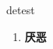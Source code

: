 
\begin{frame}
{\huge detest}
\begin{center}
\begin{enumerate}\Large
  \item \textbf{厌恶}
\end{enumerate}
\end{center}
\end{frame}
